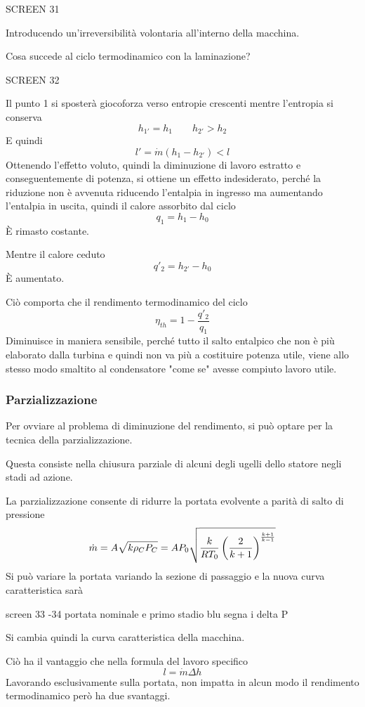 \documentclass[a4paper, 15pt]{article}
\begin{document}
\begin{adjustwidth}{2in}{}
	SCREEN 31 
	
	Introducendo un'irreversibilità volontaria all'interno della macchina. \newline
	
	Cosa succede al ciclo termodinamico con la laminazione? 
	
	SCREEN 32
	
	Il punto 1 si sposterà giocoforza verso entropie crescenti mentre l'entropia si conserva
	\[h_{1'}=h_1 \qquad h_{2'}>h_2\]
	E quindi
	\[ l' = \dot{m}(h_1-h_{2'})<l\]
	Ottenendo l'effetto voluto, quindi la diminuzione di lavoro estratto e conseguentemente di potenza, si ottiene un effetto indesiderato, perché la riduzione non è avvenuta riducendo l'entalpia in ingresso ma aumentando l'entalpia in uscita, quindi il calore assorbito dal ciclo
	\[q_1 = h_1-h_0\]
	È rimasto costante.
	
	Mentre il calore ceduto
	\[q'_2 = h_{2'}-h_0\]
	È aumentato. 
	
	Ciò comporta che il rendimento termodinamico del ciclo 
	\[\eta_{th} = 1-\dfrac{q'_2}{q_1}\]
	Diminuisce in maniera sensibile, perché tutto il salto entalpico che non è più elaborato dalla turbina e quindi non va più  a costituire potenza utile, viene allo stesso modo smaltito al condensatore "come se" avesse compiuto lavoro utile. 
	
	\subsubsection{Parzializzazione}
	Per ovviare al problema di diminuzione del rendimento, si può optare per la tecnica della parzializzazione. 
	
	Questa consiste nella chiusura parziale di alcuni degli ugelli dello statore negli stadi ad azione. 
	
	La parzializzazione consente di ridurre la portata evolvente a parità di salto di pressione 
	\[\dot{m} = A\sqrt{k\rho_CP_C} = AP_0\sqrt{\dfrac{k}{RT_0}\left(\dfrac{2}{k+1}\right)^{k+1\over k-1}} \]
	Si può variare la portata variando la sezione di passaggio e la nuova curva caratteristica sarà
	
	screen 33 -34 portata nominale e primo stadio blu segna i delta P
	
	Si cambia quindi la curva caratteristica della macchina. 
	
	Ciò ha il vantaggio che nella formula del lavoro specifico 
	\[l = \dot{m}\Delta h\]
	Lavorando esclusivamente sulla portata, non impatta in alcun modo il rendimento termodinamico però ha due svantaggi.
	

\end{adjustwidth}
\end{document}
